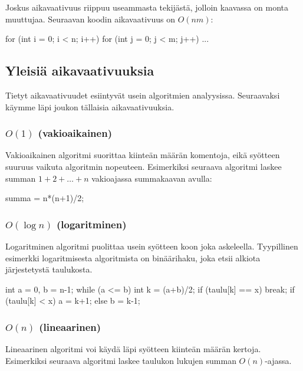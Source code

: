 Joskus aikavaativuus riippuu useammasta tekijästä,
jolloin kaavassa on monta muuttujaa.
Seuraavan koodin aikavaativuus on $O(nm)$:

\begin{code}
for (int i = 0; i < n; i++) {
    for (int j = 0; j < m; j++) {
        ...
    }
}
\end{code}

\subsection{Yleisiä aikavaativuuksia}

Tietyt aikavaativuudet esiintyvät usein algoritmien analyysissa.
Seuraavaksi käymme läpi joukon tällaisia aikavaativuuksia.

\subsubsection{$O(1)$ (vakioaikainen)}

Vakioaikainen algoritmi suorittaa kiinteän määrän komentoja,
eikä syötteen suuruus vaikuta algoritmin nopeuteen.
Esimerkiksi seuraava algoritmi laskee summan $1+2+\dots+n$
vakioajassa summakaavan avulla:

\begin{code}
summa = n*(n+1)/2;
\end{code}

\subsubsection{$O(\log n)$ (logaritminen)}

Logaritminen algoritmi puolittaa usein syötteen koon
joka askeleella. Tyypillinen esimerkki logaritmisesta algoritmista
on binäärihaku, joka etsii alkiota järjestetystä taulukosta.

\begin{code}
int a = 0, b = n-1;
while (a <= b) {
    int k = (a+b)/2;
    if (taulu[k] == x) break;
    if (taulu[k] < x) a = k+1;
    else b = k-1;
}
\end{code}

\subsubsection{$O(n)$ (lineaarinen)}

Lineaarinen algoritmi voi käydä läpi syötteen kiinteän määrän kertoja.
Esimerkiksi seuraava algoritmi laskee taulukon lukujen summan $O(n)$-ajassa.

